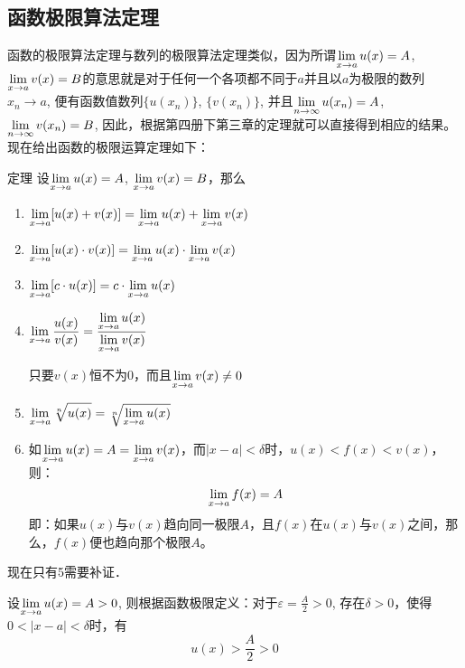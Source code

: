 \subsection{函数极限算法定理}
函数的极限算法定理与数列的极限算法定理类似，因为所谓$\displaystyle\lim_{x\to a}u(x)=A$, $\displaystyle\lim_{x\to a}v(x)=B$的意思就是对于任何一个各项都不同于$a$并且以$a$为极限的数列$x_n\to a$, 便有函数值数列$\{u(x_n)\}$, $\{v(x_n)\}$, 并且$\displaystyle\lim_{n\to \infty}u(x_n)=A$, 
$\displaystyle\lim_{n\to \infty} v(x_n)=B$, 因此，根据第四册下第三章的定理就可以直接得到相应的结果。现在给出函数的极限运算定理如下：

\begin{blk}{定理}
设$\displaystyle\lim_{x\to a}u(x)=A$, $\displaystyle\lim_{x\to a}v(x)=B$，那么
\begin{enumerate}
    \item $\displaystyle\lim_{x\to a}[u(x)+v(x)]=\displaystyle\lim_{x\to a}u(x)+\displaystyle\lim_{x\to a}v(x)$
    \item $\displaystyle\lim_{x\to a}[u(x)\cdot v(x)]=\displaystyle\lim_{x\to a} u(x)\cdot \displaystyle\lim_{x\to a}v(x)$
    \item $\displaystyle\lim_{x\to a}[c\cdot u(x)]=c\cdot \displaystyle\lim_{x\to a}u(x)$
    \item $\displaystyle\lim_{x\to a}\dfrac{u(x)}{v(x)}=\dfrac{\displaystyle\lim_{x\to a}u(x)}{\displaystyle\lim_{x\to a}v(x)}$ 
    
    只要$v(x)$恒不为0，而且$\displaystyle\lim_{x\to a}v(x)\ne 0$
    \item $\displaystyle\lim_{x\to a}\sqrt[n]{u(x)}=\sqrt[n]{\displaystyle\lim_{x\to a}u(x)}$
    \item 如$\displaystyle\lim_{x\to a}u(x)=A=\displaystyle\lim_{x\to a} v(x)$，而$|x-a|<\delta$时，$u(x)<f(x)<v(x)$，则：
    \[\displaystyle\lim_{x\to a} f(x)=A\]
    即：如果$u(x)$与$v(x)$趋向同一极限$A$，且$f(x)$在$u(x)$与$v(x)$之间，那么，$f(x)$便也趋向那个极限$A$。
\end{enumerate}
\end{blk}

现在只有5需要补证．

设$\displaystyle\lim_{x\to a}u(x)=A>0$, 则根据函数极限定义：对于$\varepsilon=\frac{A}{2}>0$, 存在$\delta>0$，使得$0<|x-a|<\delta$时，有
\begin{equation}
    u(x)>\frac{A}{2}>0
\end{equation}


